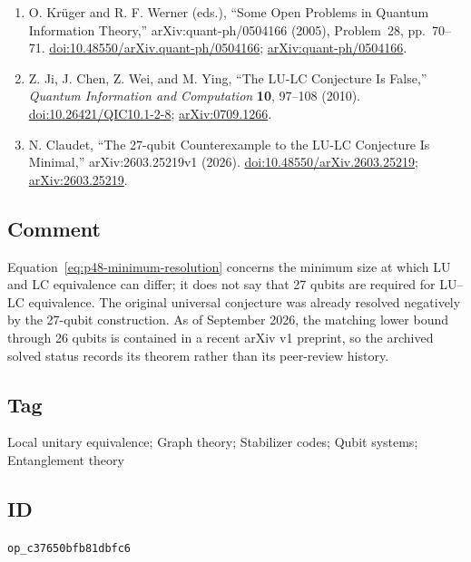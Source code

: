 \begin{enumerate}[label={},leftmargin=4.8em,labelsep=0.5em]
  \footnotesize
  \item[\textup{[KW05]}]\label{ref:p48-krueger-werner}
  O. Kr\"uger and R. F. Werner (eds.),
  ``Some Open Problems in Quantum Information Theory,''
  arXiv:quant-ph/0504166 (2005), Problem~28, pp.~70--71.
  \href{https://doi.org/10.48550/arXiv.quant-ph/0504166}%
       {doi:10.48550/arXiv.quant-ph/0504166};
  \href{https://arxiv.org/abs/quant-ph/0504166}%
       {arXiv:quant-ph/0504166}.

  \item[\textup{[JCWY10]}]\label{ref:p48-ji-et-al}
  Z. Ji, J. Chen, Z. Wei, and M. Ying,
  ``The LU-LC Conjecture Is False,''
  \emph{Quantum Information and Computation} \textbf{10}, 97--108 (2010).
  \href{https://doi.org/10.26421/QIC10.1-2-8}%
       {doi:10.26421/QIC10.1-2-8};
  \href{https://arxiv.org/abs/0709.1266}{arXiv:0709.1266}.

  \item[\textup{[Cla26]}]\label{ref:p48-claudet}
  N. Claudet, ``The 27-qubit Counterexample to the LU-LC Conjecture Is
  Minimal,'' arXiv:2603.25219v1 (2026).\newline
  \href{https://doi.org/10.48550/arXiv.2603.25219}%
       {doi:10.48550/arXiv.2603.25219};
  \href{https://arxiv.org/abs/2603.25219}{arXiv:2603.25219}.
\end{enumerate}

\subsection*{Comment}

Equation~\eqref{eq:p48-minimum-resolution} concerns the minimum size at which
LU and LC equivalence can differ; it does not say that 27 qubits are required
for LU--LC equivalence.  The original universal conjecture was already
resolved negatively by the 27-qubit construction.  As of September 2026, the
matching lower bound through 26 qubits is contained in a recent arXiv v1
preprint, so the archived solved status records its theorem rather than its
peer-review history.

\subsection*{Tag}

Local unitary equivalence; Graph theory; Stabilizer codes; Qubit systems;
Entanglement theory

\subsection*{ID}

\texttt{op\_c37650bfb81dbfc6}
